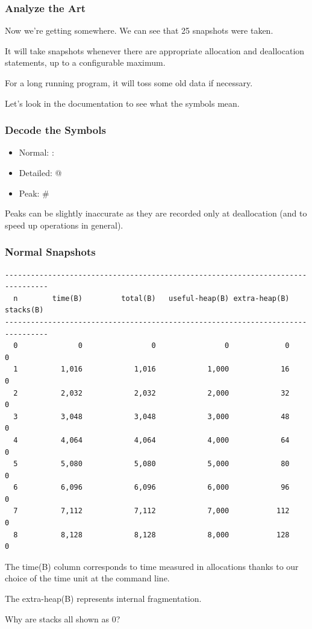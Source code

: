 \begin{frame}
\frametitle{Analyze the Art}

Now we're getting somewhere.  We can see that 25 snapshots were taken. 

It will take snapshots whenever there are appropriate allocation and deallocation statements, up to a configurable maximum. 

For a long running program, it will toss some old data if necessary. 

Let's look in the documentation to see what the symbols mean.

\end{frame}



\begin{frame}
\frametitle{Decode the Symbols}

\begin{itemize}
\item Normal: :

\item Detailed: @

\item Peak: \#
\end{itemize}

Peaks can be slightly inaccurate as they are recorded only at deallocation (and to speed up operations in general).

\end{frame}



\begin{frame}[fragile]
\frametitle{Normal Snapshots}

{\scriptsize
\begin{verbatim}
--------------------------------------------------------------------------------
  n        time(B)         total(B)   useful-heap(B) extra-heap(B)    stacks(B)
--------------------------------------------------------------------------------
  0              0                0                0             0            0
  1          1,016            1,016            1,000            16            0
  2          2,032            2,032            2,000            32            0
  3          3,048            3,048            3,000            48            0
  4          4,064            4,064            4,000            64            0
  5          5,080            5,080            5,000            80            0
  6          6,096            6,096            6,000            96            0
  7          7,112            7,112            7,000           112            0
  8          8,128            8,128            8,000           128            0
\end{verbatim}
}

The time(B) column corresponds to time measured in allocations thanks to our choice of the time unit at the command line. 

The extra-heap(B) represents internal fragmentation.

Why are stacks all shown as 0?

\end{frame}


